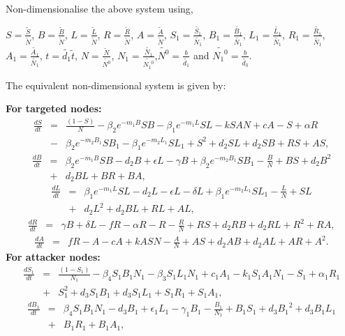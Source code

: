 \noindent Non-dimensionalise the above system using,

\noindent
$S=\frac{\tilde{S}}{\tilde{N}}$, $B=\frac{\tilde{B}}{\tilde{N}}$, $L=\frac{\tilde{L}}{\tilde{N}}$, $R=\frac{\tilde{R}}{\tilde{N}}$,
$A=\frac{\tilde{A}}{\tilde{N}}$, $S_1=\frac{\tilde{S_1}}{\tilde{N_1}}$, $B_1=\frac{\tilde{B_1}}{\tilde{N_1}}$, $L_1=\frac{\tilde{L_1}}{\tilde{N_1}}$,
$R_1=\frac{\tilde{R_1}}{\tilde{N_1}}$, $A_1=\frac{\tilde{A_1}}{\tilde{N_1}}$, $t=\tilde{d_1}\tilde{t}$, $N=\frac{\tilde{N}}{\tilde{N^0}}$,
$N_1=\frac{\tilde{N_1}}{\tilde{{N_1}^0}}$,$\tilde{N^0}=\frac{b}{\tilde{d_1}}$ and $\tilde{{N_1}^0}=\frac{b}{\tilde{d_3}}.$

\noindent The equivalent non-dimensional system is given by:

\noindent\textbf{For targeted nodes:}
\begin{eqnarray}
\frac{dS}{dt} &=& \frac{(1-S)}{N}-\beta_2 e^{-m_1B} SB-\beta_1 e^{-m_1L} SL-k SAN + cA - S + \alpha R  \nonumber\\
  &-&\beta_2 e^{-m_2B_1} SB_1-\beta_1 e^{-m_2L_1} SL_1+S^2+d_2SL+d_2SB+RS+AS,
\end{eqnarray}
\begin{eqnarray}
\frac{dB}{dt} &=& \beta_2 e^{-m_1B} SB-d_2B+\epsilon L-\gamma B+\beta_2 e^{-m_2B_1} SB_1-\frac{B}{N}+BS+d_2B^2 \nonumber\\
  &+&d_2BL+BR+BA,
\end{eqnarray}
\begin{eqnarray}
\frac{dL}{dt} &=& \beta_1 e^{-m_1L} SL-d_2L-\epsilon L-\delta L+\beta_1 e^{-m_2L_1} SL_1-\frac{L}{N}+SL \nonumber\\
  &+&d_2L^2+d_2BL+RL+AL,
\end{eqnarray}
\begin{eqnarray}
\frac{dR}{dt} &=& \gamma B+\delta L-fR-\alpha R-R-\frac{R}{N}+RS+d_2RB+d_2RL+R^2+RA,
\end{eqnarray}
\begin{eqnarray}
\frac{dA}{dt} &=& fR-A-cA+kASN-\frac{A}{N}+AS+d_2AB+d_2AL+AR+A^2.
\end{eqnarray}
\noindent\textbf{For attacker nodes:}
\begin{eqnarray}
\frac{dS_1}{dt}&=&\frac{(1-S_1)}{N_1}-\beta_4 S_1 B_1 N_1-\beta_3 S_1 L_1 N_1+c_1A_1-k_1 S_1A_1N_1-S_1+\alpha_1R_1 \nonumber \\
   &+&S_1^2+d_3S_1B_1+d_3S_1L_1+S_1R_1+S_1A_1,
\end{eqnarray}
\begin{eqnarray}
\frac{dB_1}{dt}&=&\beta_4S_1B_1N_1-d_3B_1+\epsilon_1L_1-\gamma_1B_1-\frac{B_1}{N_1}+B_1S_1+d_3{B_1}^2+d_3B_1L_1 \nonumber \\
   &+&B_1R_1+B_1A_1,
\end{eqnarray}
